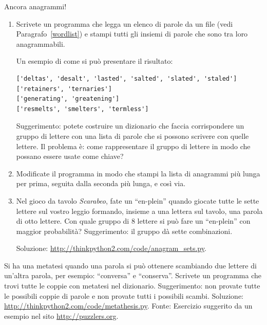 \documentclass[10pt]{book}
\begin{document}
\vspace{0.2in}
\begin{exercise}
\label{anagrams}

Ancora anagrammi!

\begin{enumerate}

\item Scrivete un programma che legga un elenco di parole da un file (vedi Paragrafo~\ref{wordlist}) e stampi tutti gli insiemi di parole che sono tra loro anagrammabili.

Un esempio di come si può presentare il risultato:

\begin{verbatim}
['deltas', 'desalt', 'lasted', 'salted', 'slated', 'staled']
['retainers', 'ternaries']
['generating', 'greatening']
['resmelts', 'smelters', 'termless']
\end{verbatim}
%
Suggerimento: potete costruire un dizionario che faccia corrispondere un gruppo di lettere con una lista di parole che si possono scrivere con quelle lettere. Il problema è: come rappresentare il gruppo di lettere in modo che possano essere usate come chiave?

\item Modificate il programma in modo che stampi la lista di anagrammi più lunga per prima, seguita dalla seconda più lunga, e così via.

\item Nel gioco da tavolo {\em Scarabeo}, fate un ``en-plein'' quando giocate tutte le sette lettere sul vostro leggio formando, insieme a una lettera sul tavolo, una parola di otto lettere. Con quale gruppo di 8 lettere si può fare un ``en-plein'' con maggior probabilità?
Suggerimento: il gruppo dà sette combinazioni.


Soluzione: \url{http://thinkpython2.com/code/anagram_sets.py}.

\end{enumerate}
\end{exercise}

\vspace{0.2in}
\begin{exercise}

Si ha una metatesi quando una parola si può ottenere scambiando due lettere di un'altra parola, per esempio: ``conversa'' e ``conserva''.  Scrivete un programma che trovi tutte le coppie con metatesi nel dizionario. Suggerimento: non provate tutte le possibili coppie di parole e non provate tutti i possibili scambi. Soluzione: \url{http://thinkpython2.com/code/metathesis.py}.
Fonte: Esercizio suggerito da un esempio nel sito \url{http://puzzlers.org}.

\end{exercise}
\end{document}
